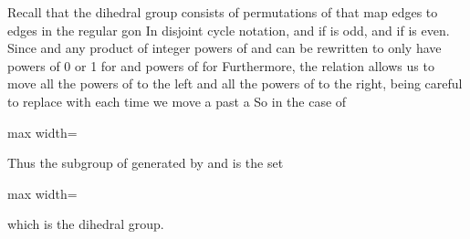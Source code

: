 \documentclass[11pt,oneside]{article}
\begin{document}
\begin{BookBody}

 Recall that the dihedral group  consists of permutations of  that map edges to edges in the regular gon  In disjoint cycle notation,  and  if  is odd, and  if  is even. Since  and  any product of integer powers of \BookInline{\mu } and \BookInline{\rho } can be rewritten to only have powers of 0 or 1 for \BookInline{\mu } and powers of  for  Furthermore, the relation  allows us to move all the powers of \BookInline{\mu } to the left and all the powers of \BookInline{\rho } to the right, being careful to replace \BookInline{\rho } with  each time we move a \BookInline{\mu } past a  So in the case of 

\begin{center}\begin{adjustbox}{max width=\linewidth}\end{adjustbox}\end{center}

\noindent Thus the subgroup of  generated by \BookInline{\mu } and \BookInline{\rho } is the set

\begin{center}\begin{adjustbox}{max width=\linewidth}\end{adjustbox}\end{center}

\noindent which is the dihedral group. \BookEnd{\blacktriangle}



\end{BookBody}
\end{document}
